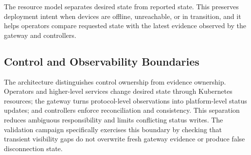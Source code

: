 The resource model separates desired state from reported state. This preserves deployment intent when devices are offline, unreachable, or in transition, and it helps operators compare requested state with the latest evidence observed by the gateway and controllers.

\subsection{Control and Observability Boundaries}
The architecture distinguishes control ownership from evidence ownership. Operators and higher-level services change desired state through Kubernetes resources; the gateway turns protocol-level observations into platform-level status updates; and controllers enforce reconciliation and consistency. This separation reduces ambiguous responsibility and limits conflicting status writes. The validation campaign specifically exercises this boundary by checking that transient visibility gaps do not overwrite fresh gateway evidence or produce false disconnection state.
